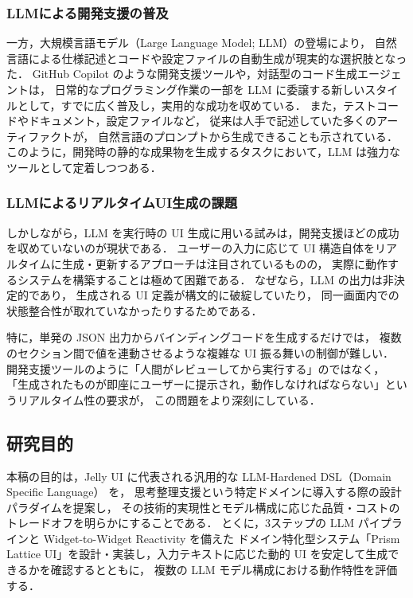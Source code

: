 \documentclass[a4paper,10pt]{jarticle}
\begin{document}
\subsubsection{LLMによる開発支援の普及}

一方，大規模言語モデル（Large Language Model; LLM）の登場により，
自然言語による仕様記述とコードや設定ファイルの自動生成が現実的な選択肢となった．
GitHub Copilot のような開発支援ツール\cite{uiuc2025copilot}や，対話型のコード生成エージェントは，
日常的なプログラミング作業の一部を LLM に委譲する新しいスタイルとして，すでに広く普及し，実用的な成功を収めている．
また，テストコードやドキュメント，設定ファイルなど，
従来は人手で記述していた多くのアーティファクトが，
自然言語のプロンプトから生成できることも示されている\cite{chen2021codex,openai2023gpt4}．
このように，開発時の静的な成果物を生成するタスクにおいて，LLM は強力なツールとして定着しつつある．

\subsubsection{LLMによるリアルタイムUI生成の課題}

しかしながら，LLM を実行時の UI 生成に用いる試みは，開発支援ほどの成功を収めていないのが現状である．
ユーザーの入力に応じて UI 構造自体をリアルタイムに生成・更新するアプローチは注目されているものの，
実際に動作するシステムを構築することは極めて困難である．
なぜなら，LLM の出力は非決定的であり，
生成される UI 定義が構文的に破綻していたり，
同一画面内での状態整合性が取れていなかったりするためである．

特に，単発の JSON 出力からバインディングコードを生成するだけでは，
複数のセクション間で値を連動させるような複雑な UI 振る舞いの制御が難しい．
開発支援ツールのように「人間がレビューしてから実行する」のではなく，
「生成されたものが即座にユーザーに提示され，動作しなければならない」というリアルタイム性の要求が，
この問題をより深刻にしている．

\subsection{研究目的}

本稿の目的は，Jelly UI に代表される汎用的な LLM-Hardened DSL（Domain Specific Language） を，
思考整理支援という特定ドメインに導入する際の設計パラダイムを提案し，
その技術的実現性とモデル構成に応じた品質・コストのトレードオフを明らかにすることである．
とくに，3ステップの LLM パイプラインと Widget-to-Widget Reactivity を備えた
ドメイン特化型システム「Prism Lattice UI」を設計・実装し，入力テキストに応じた動的 UI を安定して生成できるかを確認するとともに，
複数の LLM モデル構成における動作特性を評価する．
\end{document}
